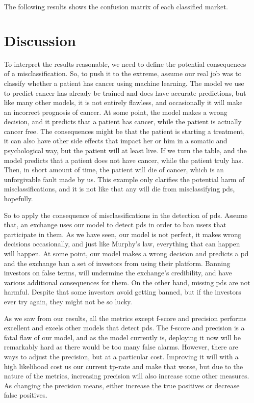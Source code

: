 The following results shows the confusion matrix of each classified market.



\newpage
\section{Discussion}
To interpret the results reasonable, we need to define the potential consequences of a misclassification. So, to push it to the extreme, assume our real job was to classify whether a patient has cancer using machine learning. The model we use to predict cancer has already be trained and does have accurate predictions, but like many other models, it is not entirely flawless, and occasionally it will make an incorrect prognosis of cancer. At some point, the model makes a wrong decision, and it predicts that a patient has cancer, while the patient is actually cancer free. The consequences might be that the patient is starting a treatment, it can also have other side effects that impact her or him in a somatic and psychological way, but the patient will at least live. If we turn the table, and the model predicts that a patient does not have cancer, while the patient truly has. Then, in short amount of time, the patient will die of cancer, which is an unforgivable fault made by us. This example only clarifies the potential harm of misclassifications, and it is not like that any will die from misclassifying \acp{pd}, hopefully.

So to apply the consequence of misclassifications in the detection of \acp{pd}. Assume that, an exchange uses our model to detect \acp{pd} in order to ban users that participate in them. As we have seen, our model is not perfect, it makes wrong decisions occasionally, and just like Murphy's law, everything that can happen will happen. At some point, our model makes a wrong decision and predicts a \ac{pd} and the exchange ban a set of investors from using their platform. Banning investors on false terms, will undermine the exchange's credibility, and have various additional consequences for them. On the other hand, missing \acp{pd} are not harmful. Despite that some investors avoid getting banned, but if the investors ever try again, they might not be so lucky.

As we saw from our results, all the metrics except f-score and precision performs excellent and excels other models that detect \acp{pd}. The f-score and precision is a fatal flaw of our model, and as the model currently is, deploying it now will be remarkably hard as there would be too many false alarms. However, there are ways to adjust the precision, but at a particular cost. Improving it will with a high likelihood cost us our current tp-rate and make that worse, but due to the nature of the metrics, increasing precision will also increase some other measures. As changing the precision means, either increase the true positives or decrease false positives.

